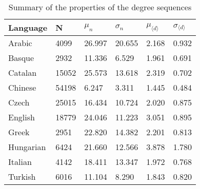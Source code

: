 \begin{table}[!htb]
\centering
\begin{tabular}{llllll}
Language & N & $\mu_n$ & $\sigma_n$ & $\mu_{\langle d \rangle}$ & $\sigma_{\langle d \rangle}$ \\ \hline

Arabic & 4099 & 26.997 & 20.655 & 2.168 & 0.932 \\
Basque & 2932 & 11.336 & 6.529 & 1.961 & 0.691 \\
Catalan & 15052 & 25.573 & 13.618 & 2.319 & 0.702 \\
Chinese & 54198 & 6.247 & 3.311 & 1.445 & 0.484 \\
Czech & 25015 & 16.434 & 10.724 & 2.020 & 0.875 \\
English & 18779 & 24.046 & 11.223 & 3.051 & 0.895 \\
Greek & 2951 & 22.820 & 14.382 & 2.201 & 0.813 \\
Hungarian & 6424 & 21.660 & 12.566 & 3.878 & 1.780 \\
Italian & 4142 & 18.411 & 13.347 & 1.972 & 0.768 \\
Turkish & 6016 & 11.104 & 8.290 & 1.843 & 0.820 \\
\end{tabular}
\caption{Summary of the properties of the degree sequences \label{tab:summary}}
\end{table}
